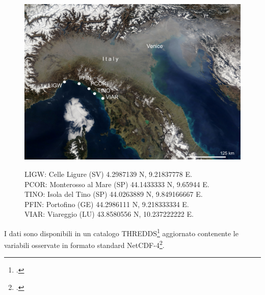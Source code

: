 \documentclass[./main.tex]{subfiles}
\begin{document}
\begin{figure}[!ht]
\noindent\begin{minipage}{0.5\textwidth}
\vspace{1cm}
\includegraphics[width=\textwidth]{images/radar_map.pdf}
\captionsetup{font=small, hypcap=false}
\label{fig:radar_map}
\end{minipage}
\hspace{0.05\textwidth}
\begin{minipage}{0.4\textwidth}
\begin{small}
LIGW: Celle Ligure (SV) 4.2987139 N, 9.21837778 E.\\PCOR: Monterosso al Mare (SP) 44.1433333 N, 9.65944 E.\\TINO: Isola del Tino (SP) 44.0263889 N, 9.849166667 E.\\PFIN: Portofino (GE) 44.2986111 N, 9.218333334 E.\\VIAR: Viareggio (LU) 43.8580556 N, 10.237222222 E.
\end{small}
\end{minipage}
\vspace{0.25cm}
\end{figure}

I dati sono disponibili in un catalogo THREDDS\footcite[\url{https://thredds.hfrnode.eu:8443/thredds/NRTcurrent/HFR-TirLig/HFR-TirLig_catalog.html}]{thredds-hfr-trilig} aggiornato contenente le variabili osservate in formato standard NetCDF-4\footcite[19-47]{HFR_QC_JERICO}.
\vspace{0.25cm}
\end{document}
